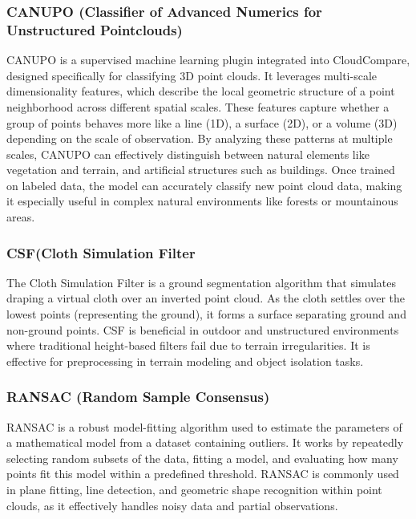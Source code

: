 \documentclass[../report.tex]{subfiles}
\begin{document}
    \subsubsection{\textbf{CANUPO} (Classifier of Advanced Numerics for Unstructured Pointclouds)}

    CANUPO is a supervised machine learning plugin integrated into CloudCompare, designed specifically for classifying 3D point clouds. It leverages multi-scale dimensionality features, which describe the local geometric structure of a point neighborhood across different spatial scales. These features capture whether a group of points behaves more like a line (1D), a surface (2D), or a volume (3D) depending on the scale of observation. By analyzing these patterns at multiple scales, CANUPO can effectively distinguish between natural elements like vegetation and terrain, and artificial structures such as buildings. Once trained on labeled data, the model can accurately classify new point cloud data, making it especially useful in complex natural environments like forests or mountainous areas.\cite{canupo} \cite{canupo2}
    
    \subsubsection{\textbf{CSF}(Cloth Simulation Filter}
    
    The Cloth Simulation Filter\cite{ClothSF} is a ground segmentation algorithm that simulates draping a virtual cloth over an inverted point cloud. As the cloth settles over the lowest points (representing the ground), it forms a surface separating ground and non-ground points. CSF is beneficial in outdoor and unstructured environments where traditional height-based filters fail due to terrain irregularities. It is effective for preprocessing in terrain modeling and object isolation tasks.
    
    \subsubsection{\textbf{RANSAC} (Random Sample Consensus)}
    
    RANSAC is a robust model-fitting algorithm used to estimate the parameters of a mathematical model from a dataset containing outliers\cite{RANSAC}. It works by repeatedly selecting random subsets of the data, fitting a model, and evaluating how many points fit this model within a predefined threshold. RANSAC is commonly used in plane fitting, line detection, and geometric shape recognition within point clouds, as it effectively handles noisy data and partial observations.
    
\end{document}
